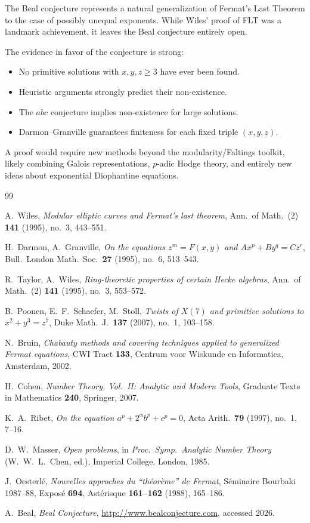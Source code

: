 \documentclass[12pt,a4paper]{amsart}
\theoremstyle{definition}
\theoremstyle{remark}
\begin{document}
The Beal conjecture represents a natural generalization of Fermat's Last Theorem
to the case of possibly unequal exponents. While Wiles' proof of FLT was a
landmark achievement, it leaves the Beal conjecture entirely open.

The evidence in favor of the conjecture is strong:
\begin{itemize}
  \item No primitive solutions with $x,y,z \geq 3$ have ever been found.
  \item Heuristic arguments strongly predict their non-existence.
  \item The $abc$ conjecture implies non-existence for large solutions.
  \item Darmon--Granville guarantees finiteness for each fixed triple $(x,y,z)$.
\end{itemize}

A proof would require new methods beyond the modularity/Faltings toolkit, likely
combining Galois representations, $p$-adic Hodge theory, and entirely new
ideas about exponential Diophantine equations.

\begin{thebibliography}{99}

A.~Wiles,
\textit{Modular elliptic curves and Fermat's last theorem},
Ann.\ of Math.\ (2) \textbf{141} (1995), no.\ 3, 443--551.

H.~Darmon, A.~Granville,
\textit{On the equations $z^m = F(x,y)$ and $Ax^p + By^q = Cz^r$},
Bull.\ London Math.\ Soc.\ \textbf{27} (1995), no.\ 6, 513--543.

R.~Taylor, A.~Wiles,
\textit{Ring-theoretic properties of certain Hecke algebras},
Ann.\ of Math.\ (2) \textbf{141} (1995), no.\ 3, 553--572.

B.~Poonen, E.~F.\ Schaefer, M.~Stoll,
\textit{Twists of $X(7)$ and primitive solutions to $x^2 + y^3 = z^7$},
Duke Math.\ J.\ \textbf{137} (2007), no.\ 1, 103--158.

N.~Bruin,
\textit{Chabauty methods and covering techniques applied to generalized Fermat equations},
CWI Tract \textbf{133}, Centrum voor Wiskunde en Informatica, Amsterdam, 2002.

H.~Cohen,
\textit{Number Theory, Vol.\ II: Analytic and Modern Tools},
Graduate Texts in Mathematics \textbf{240}, Springer, 2007.

K.~A.\ Ribet,
\textit{On the equation $a^p + 2^\alpha b^p + c^p = 0$},
Acta Arith.\ \textbf{79} (1997), no.\ 1, 7--16.

D.~W.\ Masser,
\textit{Open problems},
in \textit{Proc.\ Symp.\ Analytic Number Theory} (W.~W.\ L.\ Chen, ed.),
Imperial College, London, 1985.

J.~Oesterlé,
\textit{Nouvelles approches du ``théorème'' de Fermat},
Séminaire Bourbaki 1987--88, Exposé \textbf{694}, Astérisque \textbf{161--162} (1988), 165--186.

A.~Beal,
\textit{Beal Conjecture},
\url{http://www.bealconjecture.com}, accessed 2026.

\end{thebibliography}
\end{document}
